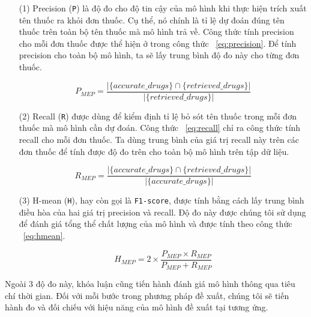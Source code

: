 \begin{itemize}

\item[(1)] Precision (\verb|P|) là độ đo cho độ tin cậy của mô hình khi thực hiện trích xuất tên thuốc ra khỏi đơn thuốc. Cụ thể, nó chính là tỉ lệ dự đoán đúng tên thuốc trên toàn bộ tên thuốc mà mô hình trả về. Công thức tính precision cho mỗi đơn thuốc được thể hiện ở trong công thức ~\ref{eq:precision}. Để tính precision cho toàn bộ mô hình, ta sẽ lấy trung bình độ đo này cho từng đơn thuốc.

\begin{dmath}
    \label{eq:precision}
    P_{MEP} = \frac{|\{accurate\_drugs\} \cap \{ retrieved\_drugs \}|}{|\{ retrieved\_drugs \}|}
\end{dmath}

\item[(2)] Recall (\verb|R|) được dùng để kiểm định tỉ lệ bỏ sót tên thuốc trong mỗi đơn thuốc mà mô hình cần dự đoán. Công thức ~\ref{eq:recall} chỉ ra công thức tính recall cho mỗi đơn thuốc. Ta dùng trung bình của giá trị recall này trên các đơn thuốc để tính được độ đo trên cho toàn bộ mô hình trên tập dữ liệu.

\begin{dmath}
    \label{eq:recall}
    R_{MEP} = \frac{|\{accurate\_drugs\} \cap \{ retrieved\_drugs \}|}{|\{ accurate\_drugs \}|}
\end{dmath}

\item[(3)] H-mean (\verb|H|), hay còn gọi là \verb|F1-score|, được tính bằng cách lấy trung bình điều hòa của hai giá trị precision và recall. Độ đo này được chúng tôi sử dụng để đánh giá tổng thể chất lượng của mô hình và được tính theo công thức ~\ref{eq:hmean}.

\begin{dmath}
    \label{eq:hmean}
    H_{MEP} = 2 \times \frac{P_{MEP} \times R_{MEP}}{P_{MEP} + R_{MEP}}
\end{dmath}

\end{itemize}

Ngoài 3 độ đo này, khóa luận cũng tiến hành đánh giá mô hình thông qua tiêu chí thời gian. Đối với mỗi bước trong phương pháp đề xuất, chúng tôi sẽ tiến hành đo và đối chiếu với hiệu năng của mô hình đề xuất tại \cite{nguyen2021developing} tương ứng.
